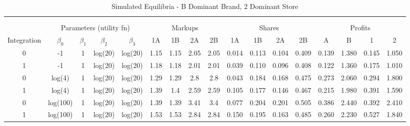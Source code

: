 \documentclass[12pt]{article}%
\begin{document}
\begin{table}[h]
{\begin{tabular}{c|cccc|cccc|cccc|cccc}
    \multicolumn{1}{c}{} &       &       &       & \multicolumn{1}{c}{} &       &       &       & \multicolumn{1}{c}{} &       &       &       & \multicolumn{1}{c}{} &       &       &       &  \\
    \multicolumn{1}{c}{} &       &       &       & \multicolumn{1}{c}{} &       &       &       & \multicolumn{1}{c}{} &       &       &       & \multicolumn{1}{c}{} &       &       &       &  \\
          & \multicolumn{4}{c|}{Parameters (utility fn)} & \multicolumn{4}{c|}{Markups}  & \multicolumn{4}{c|}{Shares}   & \multicolumn{4}{c}{Profits} \\
    \midrule
    \multicolumn{1}{c|}{Integration} & \multicolumn{1}{c}{$\beta_0$} & \multicolumn{1}{c}{$\beta_1$} & \multicolumn{1}{c}{$\beta_2$} & \multicolumn{1}{c|}{$\beta_3$} & \multicolumn{1}{c}{1A} & \multicolumn{1}{c}{1B} & \multicolumn{1}{c}{2A} & \multicolumn{1}{c|}{2B} & \multicolumn{1}{c}{1A} & \multicolumn{1}{c}{1B} & \multicolumn{1}{c}{2A} & \multicolumn{1}{c|}{2B} & \multicolumn{1}{c}{A} & \multicolumn{1}{c}{B} & \multicolumn{1}{c}{1} & \multicolumn{1}{c}{2} \\
    \midrule
    \midrule
     
    0     & -1    & 1     & log(20) & log(20) & 1.15  & 1.15  & 2.05  & 2.05  & 0.014 & 0.113 & 0.104 & 0.409 & 0.139 & 1.380 & 0.145 & 1.050 \\
    1     & -1    & 1     & log(20) & log(20) & 1.18  & 1.18  & 2.01  & 2.01  & 0.039 & 0.110 & 0.096 & 0.408 & 0.122 & 1.360 & 0.175 & 1.010 \\
    0     & log(4) & 1     & log(20) & log(20) & 1.29  & 1.29  & 2.8   & 2.8   & 0.043 & 0.184 & 0.168 & 0.475 & 0.273 & 2.060 & 0.294 & 1.800 \\
    1     & log(4) & 1     & log(20) & log(20) & 1.39  & 1.4   & 2.59  & 2.59  & 0.105 & 0.177 & 0.146 & 0.467 & 0.215 & 1.980 & 0.391 & 1.590 \\
    0     & log(100) & 1     & log(20) & log(20) & 1.39  & 1.39  & 3.41  & 3.4   & 0.077 & 0.204 & 0.201 & 0.505 & 0.386 & 2.440 & 0.392 & 2.410 \\
    1     & log(100) & 1     & log(20) & log(20) & 1.53  & 1.53  & 2.84  & 2.84  & 0.150 & 0.195 & 0.163 & 0.485 & 0.260 & 2.230 & 0.527 & 1.840 \\


    \end{tabular}%

    }
    
    \caption{Simulated Equilibria - B Dominant Brand, 2 Dominant Store}
    
  \label{tab:store effects - B, 2 dom}%
\end{table}%
\end{document}
